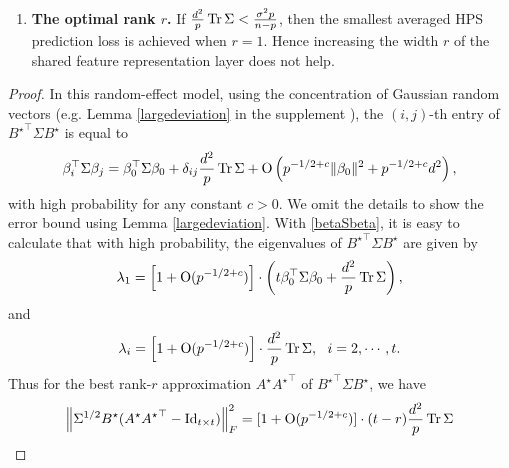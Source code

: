 \begin{example}
\begin{claim}
\begin{enumerate}
	\item {\bf The optimal rank $r$.} If $\frac{d^2}{p}\operatorname{Tr} \Sigma  < \frac{\sigma^2 p}{n - p}$, then the smallest averaged HPS  prediction loss is achieved when $r=1$. Hence increasing the width $r$ of the shared feature representation layer does not help.
\end{enumerate}
\end{claim}
\begin{proof}
    In this random-effect model, using the concentration of Gaussian random vectors (e.g. Lemma \ref{largedeviation} in the supplement  \cite{MTL_suppl}),
    the $(i, j)$-th entry of ${B^{\star}}^{\top} \Sigma B^{\star}$ is equal to %
    \begin{align}\label{betaSbeta}
    	\beta_i^{\top}\Sigma  \beta_j =\beta_0^\top \Sigma \beta_0 + \delta_{ij} \frac{d^2 }{p}\tr \Sigma + \OO\left(p^{-1/2+c}\|\beta_0\|^2+ p^{-1/2+c} d^2\right),
    \end{align}
     with high probability for any constant $c>0$. We omit the details to show the error bound using Lemma \ref{largedeviation}.
    With \eqref{betaSbeta}, it is easy to calculate that with high probability, the eigenvalues of ${B^{\star}}^{\top} \Sigma B^{\star}$ are given by
    $$\lambda_1=\left[1+\operatorname{O}(p^{-1/2+c})\right]\cdot\left(t \beta_0^\top \Sigma \beta_0  + \frac{d^2}{ p}\operatorname{Tr} \Sigma\right) ,$$
    and
    $$ \lambda_i=\left[1+\operatorname{O}(p^{-1/2+c})\right]\cdot \frac{d^2}{ p}\operatorname{Tr} \Sigma , \ \ i=2,\cdots, t.$$ %
    Thus for the best rank-$r$ approximation $A^\star {A^\star}^\top$  of ${B^{\star}}^{\top}\Sigma  B^{\star}$, we have
    $$\left\| \Sigma^{1/2} B^{\star} (A^\star {A^\star}^{\top} - \operatorname{Id}_{t\times t}) \right\|_F^2= [1+\operatorname{O}(p^{-1/2+c})]\cdot(t-r)\frac{d^2}{ p}\operatorname{Tr} \Sigma $$

\end{proof}
\end{example}
